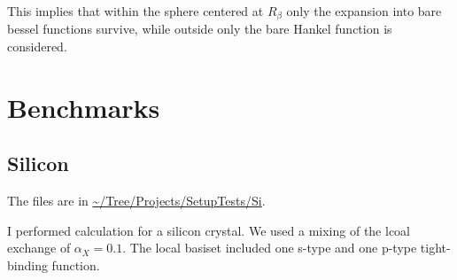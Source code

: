 \documentclass[11pt,a4paper]{report}
\begin{document}
This implies that within the sphere centered at $R_\beta$ only the
expansion into bare bessel functions survive, while outside only the
bare Hankel function is considered.




\chapter{Benchmarks}
\section{Silicon}
The files are in \url{~/Tree/Projects/SetupTests/Si}.

I performed calculation for a silicon crystal. We used a mixing of the
lcoal exchange of $\alpha_X=0.1$. The local basiset included one
s-type and one p-type tight-binding function.
\end{document}
